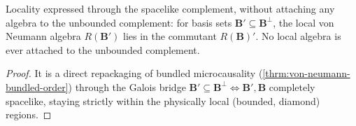 \begin{theorem}
    \label{thrm:additive-free-locality}
    \leanok
    Locality expressed through the spacelike complement, without attaching any algebra to the unbounded complement: for basis sets $\mathbf{B}' \subseteq \mathbf{B}^\perp$, the local von Neumann algebra $R(\mathbf{B}')$ lies in the commutant $R(\mathbf{B})'$. No local algebra is ever attached to the unbounded complement.
\end{theorem}
\begin{proof}
    \leanok
    It is a direct repackaging of bundled microcausality (\ref{thrm:von-neumann-bundled-order}) through the Galois bridge $\mathbf{B}' \subseteq \mathbf{B}^\perp \iff \mathbf{B}', \mathbf{B}$ completely spacelike, staying strictly within the physically local (bounded, diamond) regions.
\end{proof}

